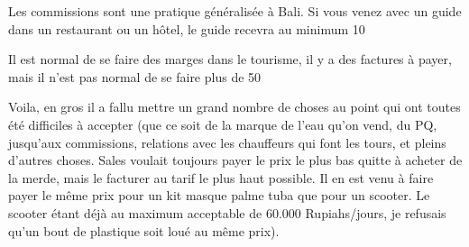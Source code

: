 \par
Les commissions sont une pratique généralisée à Bali. Si vous venez avec un guide dans un restaurant ou un hôtel, le guide recevra au minimum 10%

\par
Il est normal de se faire des marges dans le tourisme, il y a des factures à payer, mais il n’est pas normal de se faire plus de 50%

\par
Voila, en gros il a fallu mettre un grand nombre de choses au point qui ont toutes été difficiles à accepter (que ce soit de la marque de l’eau qu’on vend, du PQ, jusqu’aux commissions, relations avec les chauffeurs qui font les tours, et pleins d’autres choses. Sales voulait toujours payer le prix le plus bas quitte à acheter de la merde, mais le facturer au tarif le plus haut possible. Il en est venu à faire payer le même prix pour un kit masque palme tuba que pour un scooter. Le scooter étant déjà au maximum acceptable de 60.000 Rupiahs/jours, je refusais qu’un bout de plastique soit loué au même prix).

